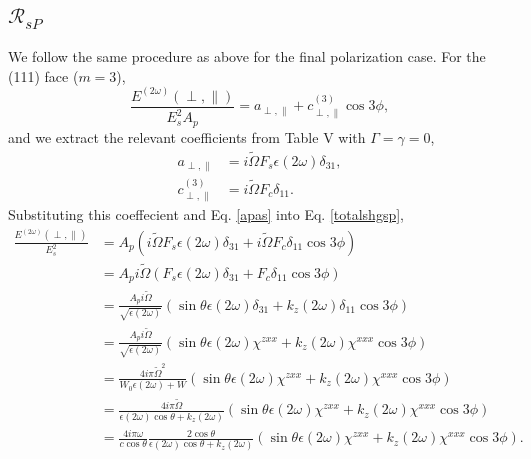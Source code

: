 \documentclass[10pt]{article}
\begin{document}
\subsection{\texorpdfstring{$\mathcal{R}_{sP}$}{RsP}}
We follow the same procedure as above for the final polarization case. For the
(111) face ($m = 3$),
\begin{equation}\label{totalshgsp} %
\frac{E^{(2\omega)}(\perp,\parallel)}{E^{2}_{s}A_{p}}
    = a_{\perp,\parallel} + c^{(3)}_{\perp,\parallel}\cos3\phi,
\end{equation}
and we extract the relevant coefficients from Table V with $\Gamma=\gamma=0$,
\begin{align*}
a_{\perp,\parallel} &= i\tilde{\Omega}F_{s}\epsilon(2\omega)\delta_{31},\\
c^{(3)}_{\perp,\parallel} &= i\tilde{\Omega}F_{c}\delta_{11}.
\end{align*}
Substituting this coeffecient and Eq. \eqref{apas} into Eq. \eqref{totalshgsp},
\begin{equation*}
\begin{split}
\frac{E^{(2\omega)}(\perp,\parallel)}{E^{2}_{s}}
&= A_{p}(i\tilde{\Omega}F_{s}\epsilon(2\omega)\delta_{31}
    + i\tilde{\Omega}F_{c}\delta_{11}\cos3\phi)\\
&= A_{p}i\tilde{\Omega}(F_{s}\epsilon(2\omega)\delta_{31}
    + F_{c}\delta_{11}\cos3\phi)\\
&= \frac{A_{p}i\tilde{\Omega}}{\sqrt{\epsilon(2\omega)}}
   (
   \sin\theta\epsilon(2\omega)\delta_{31} + k_{z}(2\omega)\delta_{11}\cos3\phi
   )\\
&= \frac{A_{p}i\tilde{\Omega}}{\sqrt{\epsilon(2\omega)}}
   (
   \sin\theta\epsilon(2\omega)\chi^{zxx} + k_{z}(2\omega)\chi^{xxx}\cos3\phi
   )\\
&= \frac{4i\pi\tilde{\Omega}^{2}}{W_{0}\epsilon(2\omega) + W}
   (
   \sin\theta\epsilon(2\omega)\chi^{zxx} + k_{z}(2\omega)\chi^{xxx}\cos3\phi
   )\\
&= \frac{4i\pi\tilde{\Omega}}{\epsilon(2\omega)\cos\theta + k_{z}(2\omega)}
   (
   \sin\theta\epsilon(2\omega)\chi^{zxx} + k_{z}(2\omega)\chi^{xxx}\cos3\phi
   )\\
&= \frac{4i\pi\omega}{c\cos\theta}
   \frac{2\cos\theta}{\epsilon(2\omega)\cos\theta + k_{z}(2\omega)}
   (\sin\theta\epsilon(2\omega)\chi^{zxx} + k_{z}(2\omega)\chi^{xxx}\cos3\phi).
\end{split}
\end{equation*}
\end{document}
